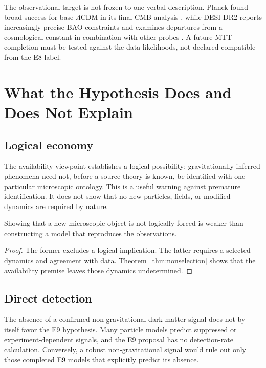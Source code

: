 \documentclass[11pt]{article}
\begin{document}
The observational target is not frozen to one verbal description.  Planck
found broad success for base $\Lambda$CDM in its final CMB analysis
\cite{Planck2018CosmologicalParameters}, while DESI DR2 reports increasingly
precise BAO constraints and examines departures from a cosmological constant
in combination with other probes \cite{DESIDR2Cosmology}.  A future MTT
completion must be tested against the data likelihoods, not declared
compatible from the E8 label.

\section{What the Hypothesis Does and Does Not Explain}

\subsection{Logical economy}

The availability viewpoint establishes a logical possibility: gravitationally
inferred phenomena need not, before a source theory is known, be identified
with one particular microscopic ontology.  This is a useful warning against
premature identification.  It does not show that no new particles, fields, or
modified dynamics are required by nature.

\begin{proposition}
Showing that a new microscopic object is not logically forced is weaker than
constructing a model that reproduces the observations.
\end{proposition}

\begin{proof}
The former excludes a logical implication.  The latter requires a selected
dynamics and agreement with data.  Theorem~\ref{thm:nonselection} shows that
the availability premise leaves those dynamics undetermined.
\end{proof}

\subsection{Direct detection}

The absence of a confirmed non-gravitational dark-matter signal does not by
itself favor the E9 hypothesis.  Many particle models predict suppressed or
experiment-dependent signals, and the E9 proposal has no detection-rate
calculation.  Conversely, a robust non-gravitational signal would rule out
only those completed E9 models that explicitly predict its absence.
\end{document}
